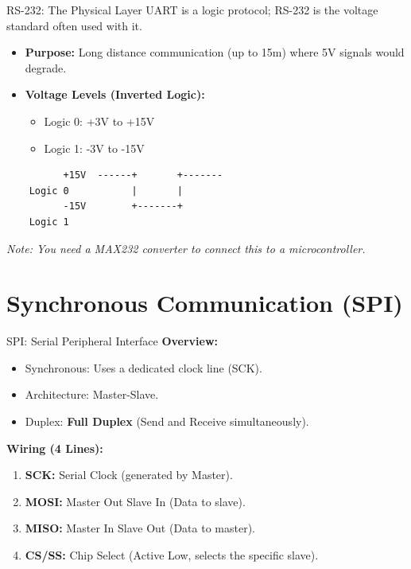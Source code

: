 \begin{frame}[fragile]{RS-232: The Physical Layer}
UART is a logic protocol; RS-232 is the voltage standard often used with it.
\begin{itemize}
    \item \textbf{Purpose:} Long distance communication (up to 15m) where 5V signals would degrade.
    \item \textbf{Voltage Levels (Inverted Logic):}
    \begin{itemize}
        \item Logic 0: +3V to +15V
        \item Logic 1: -3V to -15V
    \end{itemize}
\end{itemize}



\begin{verbatim}
          +15V  ------+       +-------
    Logic 0           |       |
          -15V        +-------+
    Logic 1
\end{verbatim}
\textit{Note: You need a MAX232 converter to connect this to a microcontroller.}
\end{frame}

\section{Synchronous Communication (SPI)}

\begin{frame}{SPI: Serial Peripheral Interface}
\textbf{Overview:}
\begin{itemize}
    \item Synchronous: Uses a dedicated clock line (SCK).
    \item Architecture: Master-Slave.
    \item Duplex: \textbf{Full Duplex} (Send and Receive simultaneously).
\end{itemize}

\textbf{Wiring (4 Lines):}
\begin{enumerate}
    \item \textbf{SCK:} Serial Clock (generated by Master).
    \item \textbf{MOSI:} Master Out Slave In (Data to slave).
    \item \textbf{MISO:} Master In Slave Out (Data to master).
    \item \textbf{CS/SS:} Chip Select (Active Low, selects the specific slave).
\end{enumerate}
\end{frame}

